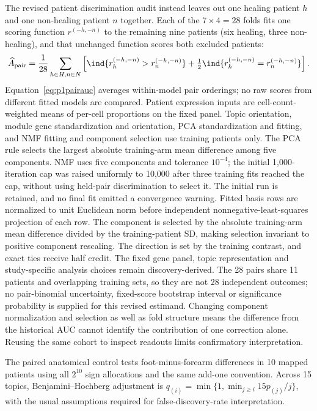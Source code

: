 \documentclass[10pt,a4paper]{article}
\begin{document}
The revised patient discrimination audit instead leaves out one healing patient $h$ and one non-healing patient $n$ together. Each of the $7\times4=28$ folds fits one scoring function $r^{(-h,-n)}$ to the remaining nine patients (six healing, three non-healing), and that unchanged function scores both excluded patients:
\begin{equation}
\widehat A_{\rm pair}=\frac1{28}\sum_{h\in H,n\in N}\left[\ind\{r^{(-h,-n)}_h>r^{(-h,-n)}_n\}+\tfrac12\ind\{r^{(-h,-n)}_h=r^{(-h,-n)}_n\}\right].\label{eq:p1pairauc}
\end{equation}
Equation~\eqref{eq:p1pairauc} averages within-model pair orderings; no raw scores from different fitted models are compared. Patient expression inputs are cell-count-weighted means of per-cell proportions on the fixed panel. Topic orientation, module gene standardization and orientation, PCA standardization and fitting, and NMF fitting and component selection use training patients only. The PCA rule selects the largest absolute training-arm mean difference among five components. NMF uses five components and tolerance $10^{-4}$; the initial 1,000-iteration cap was raised uniformly to 10,000 after three training fits reached the cap, without using held-pair discrimination to select it. The initial run is retained, and no final fit emitted a convergence warning. Fitted basis rows are normalized to unit Euclidean norm before independent nonnegative-least-squares projection of each row. The component is selected by the absolute training-arm mean difference divided by the training-patient SD, making selection invariant to positive component rescaling. The direction is set by the training contrast, and exact ties receive half credit. The fixed gene panel, topic representation and study-specific analysis choices remain discovery-derived. The 28 pairs share 11 patients and overlapping training sets, so they are not 28 independent outcomes; no pair-binomial uncertainty, fixed-score bootstrap interval or significance probability is supplied for this revised estimand. Changing component normalization and selection as well as fold structure means the difference from the historical AUC cannot identify the contribution of one correction alone. Reusing the same cohort to inspect readouts limits confirmatory interpretation.

The paired anatomical control tests foot-minus-forearm differences in 10 mapped patients using all $2^{10}$ sign allocations and the same add-one convention. Across 15 topics, Benjamini--Hochberg adjustment is $q_{(i)}=\min\{1,\min_{j\geq i}15p_{(j)}/j\}$, with the usual assumptions required for false-discovery-rate interpretation.
\end{document}
